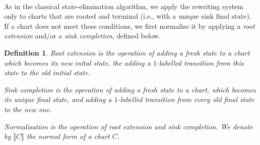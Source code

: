 \documentclass{article}
\newtheorem{definition}{Definition}[section]
\begin{document}

~\\
As in the classical state-elimination algorithm, we apply the rewriting system only to charts that are rooted and terminal (i.e., with a unique sink final state). If a chart does not meet these conditions, we first normalise it by applying a \emph{root extension} and/or a \emph{sink completion}, defined below.

\begin{definition}
     \emph{Root extension} is the operation of adding a fresh state to a chart which becomes its new inital state,
     the adding a $1$-labelled transition from this state to the old initial state.

    \emph{Sink completion} is the operation of adding a fresh state to a chart, which becomes its unique final state, 
    and adding a $1$-labelled transition from every old final state to the new one.

     \emph{Normalisation} is the operation of root extension and sink completion. We denote by 
     $\llbracket C \rrbracket$ the normal form of a chart $C$.
\end{definition}
\end{document}
